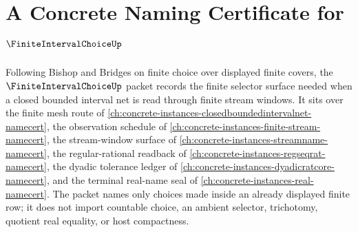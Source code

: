 \chapter{A Concrete Naming Certificate for $\FiniteIntervalChoiceUp$}
\label{ch:concrete-instances-finite-interval-choice-namecert}

Following Bishop and Bridges on finite choice over displayed finite covers, the $\FiniteIntervalChoiceUp$ packet records the finite selector surface needed when a closed bounded interval net is read through finite stream windows. It sits over the finite mesh route of \autoref{ch:concrete-instances-closedboundedintervalnet-namecert}, the observation schedule of \autoref{ch:concrete-instances-finite-stream-namecert}, the stream-window surface of \autoref{ch:concrete-instances-streamname-namecert}, the regular-rational readback of \autoref{ch:concrete-instances-regseqrat-namecert}, the dyadic tolerance ledger of \autoref{ch:concrete-instances-dyadicratcore-namecert}, and the terminal real-name seal of \autoref{ch:concrete-instances-real-namecert}. The packet names only choices made inside an already displayed finite row; it does not import countable choice, an ambient selector, trichotomy, quotient real equality, or host compactness.

